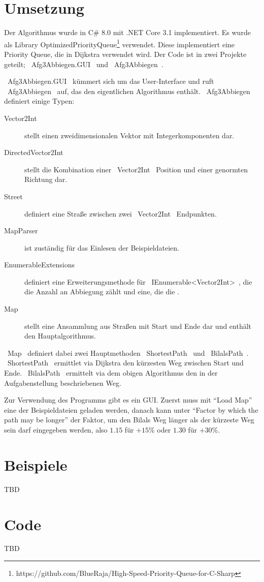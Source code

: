 \documentclass{article}
\theoremstyle{nonumberplain}
\begin{document}
\section{Umsetzung}

Der Algorithmus wurde in C\# 8.0 mit .NET Core 3.1 implementiert.
Es wurde als Library OptimizedPriorityQueue\footnote{https://github.com/BlueRaja/High-Speed-Priority-Queue-for-C-Sharp} verwendet. Diese implementiert eine Priority Queue, die in Dijkstra verwendet wird.
Der Code ist in zwei Projekte geteilt;
~Afg3Abbiegen.GUI~ und ~Afg3Abbiegen~.

~Afg3Abbiegen.GUI~ kümmert sich um das User-Interface und ruft ~Afg3Abbiegen~ auf, das den eigentlichen Algorithmus enthält.
~Afg3Abbiegen~ definiert einige Typen:

\begin{description}
    \item[Vector2Int] stellt einen zweidimensionalen Vektor mit Integerkomponenten dar.
    \item[DirectedVector2Int] stellt die Kombination einer ~Vector2Int~ Position und einer genormten Richtung dar.
    \item[Street] definiert eine Straße zwischen zwei ~Vector2Int~ Endpunkten.
    \item[MapParser] ist zuständig für das Einlesen der Beispieldateien.
    \item[EnumerableExtensions] definiert eine Erweiterungsmethode für ~IEnumerable<Vector2Int>~, die die Anzahl an Abbiegung zählt und eine, die die .
    \item[Map] stellt eine Ansammlung aus Straßen mit Start und Ende dar und enthält den Hauptalgorithmus. 
\end{description}

~Map~ definiert dabei zwei Hauptmethoden
~ShortestPath~ und ~BilalsPath~.
~ShortestPath~ ermittlet via Dijkstra den kürzesten Weg zwischen Start und Ende.
~BilalsPath~ ermittelt via dem obigen Algorithmus den in der Aufgabenstellung beschriebenen Weg.

Zur Verwendung des Programms gibt es ein GUI.
Zuerst muss mit ``Load Map'' eine der Beispieldateien geladen werden, danach kann unter ``Factor by which the path may be longer'' der Faktor, um den Bilals Weg länger als der kürzeste Weg sein darf eingegeben werden, also \(1.15\) für \(+15\%\) oder \(1.30\) für \(+30\%\).

\section{Beispiele}

TBD

\section{Code}

TBD
\end{document}
